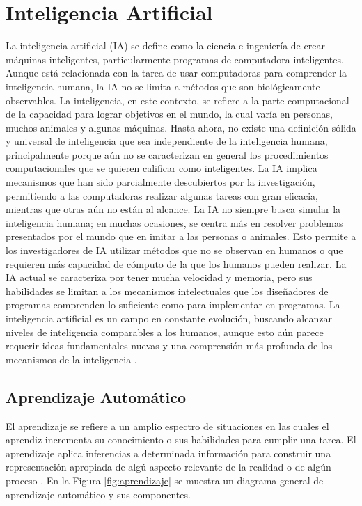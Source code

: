 \section{Inteligencia Artificial}
La inteligencia artificial (IA) se define como la ciencia e ingeniería de crear
máquinas inteligentes, particularmente programas de computadora inteligentes.
Aunque está relacionada con la tarea de usar computadoras para comprender la
inteligencia humana, la IA no se limita a métodos que son biológicamente observables.
La inteligencia, en este contexto, se refiere a la parte computacional de la
capacidad para lograr objetivos en el mundo, la cual varía en personas, muchos
animales y algunas máquinas. Hasta ahora, no existe una definición sólida y
universal de inteligencia que sea independiente de la inteligencia humana,
principalmente porque aún no se caracterizan en general los procedimientos
computacionales que se quieren calificar como inteligentes. La IA implica
mecanismos que han sido parcialmente descubiertos por la investigación,
permitiendo a las computadoras realizar algunas tareas con gran eficacia,
mientras que otras aún no están al alcance. La IA no siempre busca simular
la inteligencia humana; en muchas ocasiones, se centra más en resolver problemas
presentados por el mundo que en imitar a las personas o animales. Esto permite a
los investigadores de IA utilizar métodos que no se observan en humanos o que
requieren más capacidad de cómputo de la que los humanos pueden realizar. La IA
actual se caracteriza por tener mucha velocidad y memoria, pero sus habilidades
se limitan a los mecanismos intelectuales que los diseñadores de programas
comprenden lo suficiente como para implementar en programas. La inteligencia
artificial es un campo en constante evolución, buscando alcanzar niveles de
inteligencia comparables a los humanos, aunque esto aún parece requerir ideas
fundamentales nuevas y una comprensión más profunda de los mecanismos de la
inteligencia \cite{mccarthy2004artificial}.

\subsection{Aprendizaje Automático}
El aprendizaje se refiere a un amplio espectro de situaciones en las cuales el
aprendiz incrementa su conocimiento o sus habilidades para cumplir una tarea. El aprendizaje
aplica inferencias a determinada información para construir una representación apropiada de
algú aspecto relevante de la realidad o de algún proceso \cite{moreno1994aprendizaje}.
En la Figura \ref{fig:aprendizaje} se muestra un diagrama general de aprendizaje
automático y sus componentes.

